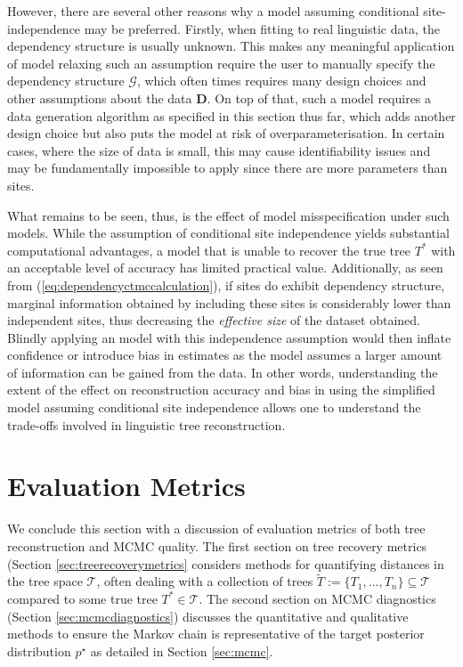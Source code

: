 However, there are several other reasons why a model assuming conditional site-independence may be preferred. Firstly, when fitting to real linguistic data, the dependency structure is usually unknown. This makes any meaningful application of model relaxing such an assumption require the user to manually specify the dependency structure $\mathcal{G}$, which often times requires many design choices and other assumptions about the data $\mathbf{D}$. On top of that, such a model requires a data generation algorithm as specified in this section thus far, which adds another design choice but also puts the model at risk of overparameterisation. In certain cases, where the size of data is small, this may cause identifiability issues and may be fundamentally impossible to apply since there are more parameters than sites. 

What remains to be seen, thus, is the effect of model misspecification under such models. While the assumption of conditional site independence yields substantial computational advantages, a model that is unable to recover the true tree $T^*$ with an acceptable level of accuracy has limited practical value. Additionally, as seen from (\ref{eq:dependencyctmccalculation}), if sites do exhibit dependency structure, marginal information obtained by including these sites is considerably lower than independent sites, thus decreasing the \textit{effective size} of the dataset obtained. Blindly applying an model with this independence assumption would then inflate confidence or introduce bias in estimates as the model assumes a larger amount of information can be gained from the data. In other words, understanding the extent of the effect on reconstruction accuracy and bias in using the simplified model assuming conditional site independence allows one to understand the trade-offs involved in linguistic tree reconstruction. 

\section{Evaluation Metrics}
\label{sec:evalmetrics}
We conclude this section with a discussion of evaluation metrics of both tree reconstruction and MCMC quality. The first section on tree recovery metrics (Section \ref{sec:treerecoverymetrics} considers methods for quantifying distances in the tree space $\mathcal{T}$, often dealing with a collection of trees $\tilde{T} := \{T_1, \dots, T_n\} \subseteq \mathcal{T}$ compared to some true tree $T^* \in \mathcal{T}$. The second section on MCMC diagnostics (Section \ref{sec:mcmcdiagnostics}) discusses the quantitative and qualitative methods to ensure the Markov chain is representative of the target posterior distribution $p^\star$ as detailed in Section \ref{sec:mcmc}.
